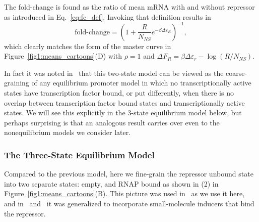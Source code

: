 The fold-change is  found as the ratio of mean mRNA with and without repressor
as introduced in Eq.~\ref{eq:fc_def}. Invoking that definition results in
\begin{equation}
\text{fold-change}
= \left(1 + \frac{R}{N_{NS}} e^{-\beta\Delta\varepsilon_R}\right)^{-1},
\end{equation}
which clearly matches the form of the master curve in
Figure~\ref{fig1:means_cartoons}(D) with $\rho=1$ and $\Delta F_R = 
\beta\Delta\varepsilon_r - \log (R / N_{NS})$.

In fact it was noted in~\cite{Chure2019} that this two-state model can be viewed
as the coarse-graining of any equilibrium promoter model in which no
transcriptionally active states have transcription factor bound, or put
differently, when there is no overlap between
transcription factor bound states and transcriptionally
active states. We will see this explicitly in the 3-state equilibrium model
below, but perhaps surprising is that an analogous result carries over even to
the nonequilibrium models we consider later.

\subsubsection{The Three-State Equilibrium Model}
Compared to the previous model, here we fine-grain the repressor unbound state
into two separate states: empty, and RNAP bound as shown in (2) in
Figure~\ref{fig1:means_cartoons}(B). This picture was used in~\cite{Garcia2011a}
as we use it here, and in~\cite{Razo-Mejia2018} and~\cite{Chure2019} it was
generalized to incorporate small-molecule inducers that bind the repressor. 

